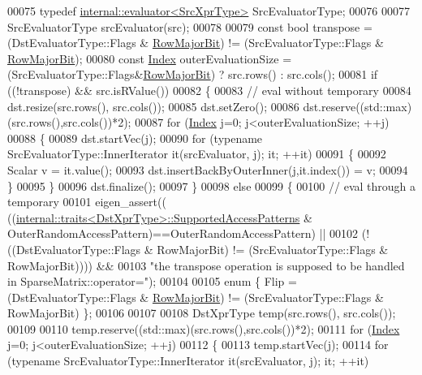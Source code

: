 \begin{DoxyCode}
00075   \textcolor{keyword}{typedef} \hyperlink{struct_eigen_1_1internal_1_1evaluator}{internal::evaluator<SrcXprType>} SrcEvaluatorType;
00076 
00077   SrcEvaluatorType srcEvaluator(src);
00078 
00079   \textcolor{keyword}{const} \textcolor{keywordtype}{bool} transpose = (DstEvaluatorType::Flags & \hyperlink{group__flags_gae4f56c2a60bbe4bd2e44c5b19cbe8762}{RowMajorBit}) != (SrcEvaluatorType::Flags & 
      \hyperlink{group__flags_gae4f56c2a60bbe4bd2e44c5b19cbe8762}{RowMajorBit});
00080   \textcolor{keyword}{const} \hyperlink{namespace_eigen_a62e77e0933482dafde8fe197d9a2cfde}{Index} outerEvaluationSize = (SrcEvaluatorType::Flags&\hyperlink{group__flags_gae4f56c2a60bbe4bd2e44c5b19cbe8762}{RowMajorBit}) ? src.rows() : 
      src.cols();
00081   \textcolor{keywordflow}{if} ((!transpose) && src.isRValue())
00082   \{
00083     \textcolor{comment}{// eval without temporary}
00084     dst.resize(src.rows(), src.cols());
00085     dst.setZero();
00086     dst.reserve((std::max)(src.rows(),src.cols())*2);
00087     \textcolor{keywordflow}{for} (\hyperlink{namespace_eigen_a62e77e0933482dafde8fe197d9a2cfde}{Index} j=0; j<outerEvaluationSize; ++j)
00088     \{
00089       dst.startVec(j);
00090       \textcolor{keywordflow}{for} (\textcolor{keyword}{typename} SrcEvaluatorType::InnerIterator it(srcEvaluator, j); it; ++it)
00091       \{
00092         Scalar v = it.value();
00093         dst.insertBackByOuterInner(j,it.index()) = v;
00094       \}
00095     \}
00096     dst.finalize();
00097   \}
00098   \textcolor{keywordflow}{else}
00099   \{
00100     \textcolor{comment}{// eval through a temporary}
00101     eigen\_assert(( ((\hyperlink{struct_eigen_1_1internal_1_1traits}{internal::traits<DstXprType>::SupportedAccessPatterns}
       & OuterRandomAccessPattern)==OuterRandomAccessPattern) ||
00102               (!((DstEvaluatorType::Flags & RowMajorBit) != (SrcEvaluatorType::Flags & RowMajorBit)))) &&
00103               \textcolor{stringliteral}{"the transpose operation is supposed to be handled in SparseMatrix::operator="});
00104 
00105     \textcolor{keyword}{enum} \{ Flip = (DstEvaluatorType::Flags & \hyperlink{group__flags_gae4f56c2a60bbe4bd2e44c5b19cbe8762}{RowMajorBit}) != (SrcEvaluatorType::Flags & 
      RowMajorBit) \};
00106 
00107     
00108     DstXprType temp(src.rows(), src.cols());
00109 
00110     temp.reserve((std::max)(src.rows(),src.cols())*2);
00111     \textcolor{keywordflow}{for} (\hyperlink{namespace_eigen_a62e77e0933482dafde8fe197d9a2cfde}{Index} j=0; j<outerEvaluationSize; ++j)
00112     \{
00113       temp.startVec(j);
00114       \textcolor{keywordflow}{for} (\textcolor{keyword}{typename} SrcEvaluatorType::InnerIterator it(srcEvaluator, j); it; ++it)

\end{DoxyCode}
